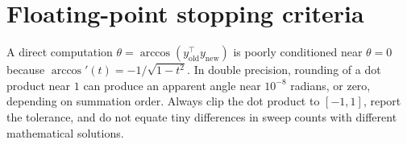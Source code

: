\section{Floating-point stopping criteria}
A direct computation $\theta=\arccos(y_{\mathrm{old}}^\top y_{\mathrm{new}})$ is poorly conditioned near $\theta=0$ because $\arccos'(t)=-1/\sqrt{1-t^2}$. In double precision, rounding of a dot product near $1$ can produce an apparent angle near $10^{-8}$ radians, or zero, depending on summation order. Always clip the dot product to $[-1,1]$, report the tolerance, and do not equate tiny differences in sweep counts with different mathematical solutions.
